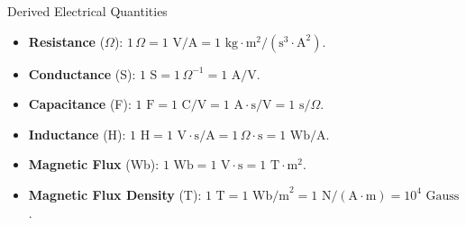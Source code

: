 \begin{formulabox}{Derived Electrical Quantities}
\begin{itemize}[leftmargin=1.5em]
    \item \textbf{Resistance} ($\Omega$): $1\,\Omega = 1\text{ V/A} = 1\text{ kg}\cdot\text{m}^2/(\text{s}^3\cdot\text{A}^2)$.
    \item \textbf{Conductance} (S): $1\text{ S} = 1\,\Omega^{-1} = 1\text{ A/V}$.
    \item \textbf{Capacitance} (F): $1\text{ F} = 1\text{ C/V} = 1\text{ A}\cdot\text{s/V} = 1\text{ s}/\Omega$.
    \item \textbf{Inductance} (H): $1\text{ H} = 1\text{ V}\cdot\text{s/A} = 1\,\Omega\cdot\text{s} = 1\text{ Wb/A}$.
    \item \textbf{Magnetic Flux} (Wb): $1\text{ Wb} = 1\text{ V}\cdot\text{s} = 1\text{ T}\cdot\text{m}^2$.
    \item \textbf{Magnetic Flux Density} (T): $1\text{ T} = 1\text{ Wb/m}^2 = 1\text{ N}/(\text{A}\cdot\text{m}) = 10^4\text{ Gauss}$.
\end{itemize}
\end{formulabox}
